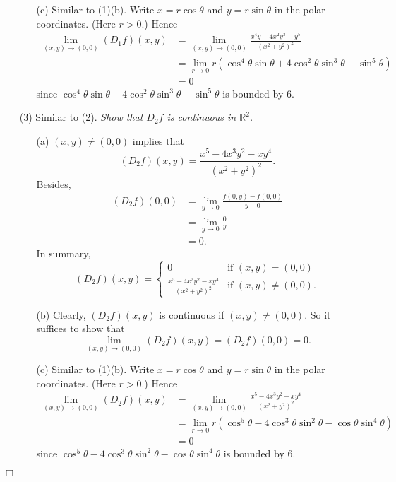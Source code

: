 \documentclass{article}
\begin{document}
\begin{enumerate}
\begin{enumerate}
  \item[(c)]
    Similar to (1)(b).
    Write $x = r\cos\theta$ and $y = r\sin\theta$ in the polar coordinates.
    (Here $r > 0$.)
    Hence
    \begin{align*}
      \lim_{(x,y) \to (0,0)} (D_1 f)(x,y)
      &= \lim_{(x,y) \to (0,0)} \frac{x^4y+4x^2y^3-y^5}{(x^2+y^2)^2} \\
      &= \lim_{r \to 0} r (\cos^4\theta\sin\theta+4\cos^2\theta\sin^3\theta-\sin^5\theta) \\
      &= 0
    \end{align*}
    since $\cos^4\theta\sin\theta+4\cos^2\theta\sin^3\theta-\sin^5\theta$ is bounded by $6$.
  \end{enumerate}

\item[(3)]
  Similar to (2).
  \emph{Show that $D_2 f$ is continuous in $\mathbb{R}^2$.}
  \begin{enumerate}
  \item[(a)]
    $(x,y) \neq (0,0)$ implies that
    \[
      (D_2 f)(x,y) = \frac{x^5-4x^3y^2-xy^4}{(x^2+y^2)^2}.
    \]
    Besides,
    \begin{align*}
      (D_2 f)(0,0)
      &= \lim_{y \to 0} \frac{f(0,y) - f(0,0)}{y - 0} \\
      &= \lim_{y \to 0} \frac{0}{y} \\
      &= 0.
    \end{align*}
    In summary,
    \begin{equation*}
      (D_{2} f)(x,y) =
      \begin{cases}
        0
          & \text{if $(x,y) = (0,0)$} \\
        \frac{x^5-4x^3y^2-xy^4}{(x^2+y^2)^2}
          & \text{if $(x,y) \neq (0,0)$}.
      \end{cases}
    \end{equation*}

  \item[(b)]
    Clearly, $(D_2 f)(x,y)$ is continuous if $(x,y) \neq (0,0)$.
    So it suffices to show that
    \[
      \lim_{(x,y) \to (0,0)} (D_2 f)(x,y) = (D_2 f)(0,0) = 0.
    \]

  \item[(c)]
    Similar to (1)(b).
    Write $x = r\cos\theta$ and $y = r\sin\theta$ in the polar coordinates.
    (Here $r > 0$.)
    Hence
    \begin{align*}
      \lim_{(x,y) \to (0,0)} (D_2 f)(x,y)
      &= \lim_{(x,y) \to (0,0)} \frac{x^5-4x^3y^2-xy^4}{(x^2+y^2)^2} \\
      &= \lim_{r \to 0} r(\cos^5\theta-4\cos^3\theta\sin^2\theta-\cos\theta\sin^4\theta) \\
      &= 0
    \end{align*}
    since $\cos^5\theta-4\cos^3\theta\sin^2\theta-\cos\theta\sin^4\theta$ is bounded by $6$.
  \end{enumerate}
\end{enumerate}
$\Box$ \\
\end{document}
